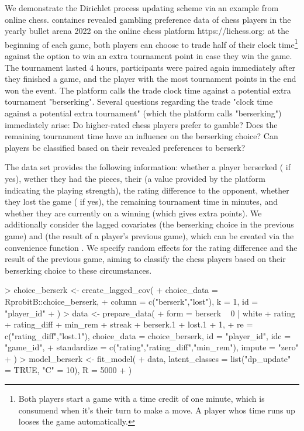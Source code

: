 \documentclass[article]{jss}
\newcommand{\fct}[1]{\code{#1()}}
\begin{document}
We demonstrate the Dirichlet process updating scheme via an example from online chess.  containes revealed gambling preference data of chess players in the yearly bullet arena 2022 on the online chess platform https://lichess.org: at the beginning of each game, both players can choose to trade half of their clock time\footnote{Both players start a game with a time credit of one minute, which is consumend when it's their turn to make a move. A player whos time runs up looses the game automatically.} against the option to win an extra tournament point in case they win the game. The tournament lasted 4 hours, participants were paired again immediately after they finished a game, and the player with the most tournament points in the end won the event. The platform calls the trade clock time against a potential extra tournament "berserking". Several questions regarding the trade "clock time against a potential extra tournament" (which the platform calls "berserking") immediately arise: Do higher-rated chess players prefer to gamble? Does the remaining tournament time have an influence on the berserking choice? Can players be classified based on their revealed preferences to berserk?

The  data set provides the following information: whether a player berserked ( if yes), wether they had the  pieces, their  (a value provided by the platform indicating the playing strength), the rating difference  to the opponent, whether they lost the game ( if yes), the remaining tournament time  in minutes, and whether they are currently on a winning  (which gives extra points). We additionally consider the lagged covariates  (the berserking choice in the previous game) and  (the result of a player's previous game), which can be created via the convenience function \fct{choice\_berserk}. We specify random effects for the rating difference and the result of the previous game, aiming to classify the chess players based on their berserking choice to these circumstances.

\begin{Schunk}
\begin{Sinput}
> choice_berserk <- create_lagged_cov(
+    choice_data = RprobitB::choice_berserk,
+    column = c("berserk","lost"), k = 1, id = "player_id"
+  )
> data <- prepare_data(
+    form = berserk ~ 0 | white + rating + rating_diff + min_rem + streak + berserk.1 + lost.1 + 1,
+    re = c("rating_diff","lost.1"), choice_data = choice_berserk, id = "player_id", idc = "game_id",
+    standardize = c("rating","rating_diff","min_rem"), impute = "zero"
+  )
> model_berserk <- fit_model(
+    data, latent_classes = list("dp_update" = TRUE, "C" = 10), R = 5000
+  )
\end{Sinput}
\end{Schunk}
\end{document}
